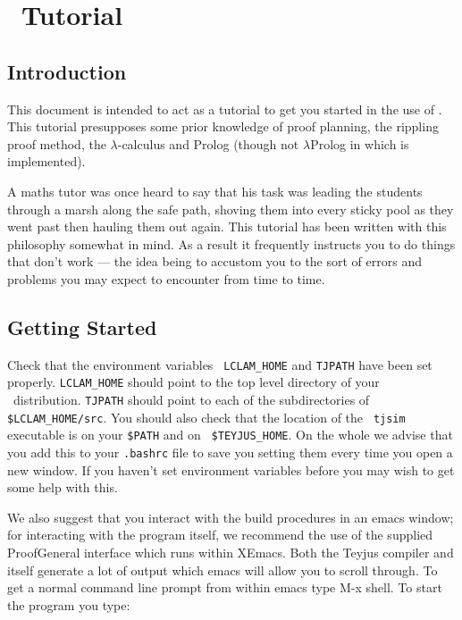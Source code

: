 \chapter{\lclam\ Tutorial}
\label{tutorial}

\section{Introduction}
\begin{sloppypar}
  This document is intended to act as a tutorial to get you started in
  the use of \lclam.  This tutorial presupposes some prior knowledge
  of proof planning, the
  rippling
  proof method, the
  $\lambda$-calculus and Prolog (though not
  $\lambda$Prolog in which {\lclam} is implemented).
\end{sloppypar}

A maths tutor was once heard to say that his task was leading the
students through a marsh along the safe path, shoving them into every
sticky pool as they went past then hauling them out again.  This
tutorial has been written with this philosophy somewhat in mind.  As a
result it frequently instructs you to do things that don't work ---
the idea being to accustom you to the sort of errors and problems you
may expect to encounter from time to time.

\section{Getting Started}
Check that the environment variables {\tt
  LCLAM\_HOME} and {\tt TJPATH} have
been set properly.  {\tt LCLAM\_HOME} should point to the top level
directory of your \lclam\ distribution.  {\tt TJPATH} should point to
each of the subdirectories of {\tt \$LCLAM\_HOME/src}.
You should also check that the location of the {\tt
  tjsim} executable is on your {\tt \$PATH} and on {\tt
  \$TEYJUS\_HOME}.  On the whole we advise that
you add this to your {\tt .bashrc} file to save you setting them every
time you open a new window.  If you haven't set environment variables
before you may wish to get some help with this.

We also suggest that you interact with the build procedures in an
emacs window; for interacting with the program itself, we recommend
the use of the supplied ProofGeneral interface which runs within
XEmacs.  Both the Teyjus compiler and \lclam itself generate a lot of
output which emacs will allow you to scroll through.  To get a normal
command line prompt from within emacs type M-x shell.  To start the
program you type:

